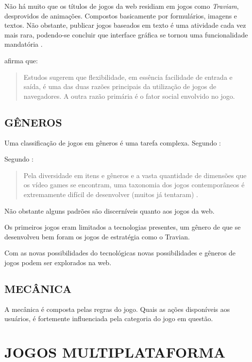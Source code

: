 Não há muito que os títulos de jogos da web residiam em jogos como
\textit{Traviam}, desprovidos de animações. Compostos basicamente por
formulários, imagens e textos. Não obstante, publicar jogos baseados
em texto é uma atividade cada vez mais rara, podendo-se concluir que
interface gráfica se tornou uma funcionalidade mandatória
\autocite{browserGamesTechnologyAndFuture}.

\cite{browserGamesTechnologyAndFuture} afirma que:
\begin{quote}
Estudos sugerem que flexibilidade, em essência facilidade de entrada
e saída, é uma das duas razões principais da utilização de jogos
de navegadores. A outra razão primária é o fator social envolvido no
jogo.
\end{quote}


\subsection{GÊNEROS}

Uma classificação de jogos em gêneros é uma tarefa complexa. Segundo \autocite{gamebenefits}:

Segundo \cite[pp. 60]{gamebenefits}:
\begin{quote}
Pela diversidade em itens e gêneros e a vasta quantidade de dimensões
que os vídeo games se encontram, uma taxonomia dos jogos contemporâneos
é extremamente difícil de desenvolver (muitos já tentaram) .
\end{quote}

Não obstante alguns padrões são discerníveis quanto aos jogos da
web.

Os primeiros jogos eram limitados a tecnologias presentes, um gênero de
que se desenvolveu bem foram os jogos de estratégia como o Travian.

Com as novas possibilidades do tecnológicas novas possibilidades e
gêneros de jogos podem ser explorados na web.

\subsection{MECÂNICA}

A mecânica é composta pelas regras do jogo. Quais as ações
disponíveis aos usuários, é fortemente influenciada pela categoria do
jogo em questão.

\section{JOGOS MULTIPLATAFORMA}

